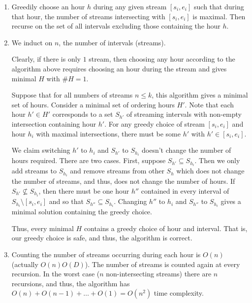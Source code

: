\documentclass[12 pt, letterpaper]{hmcpset}
\begin{document}
\begin{solution}
	\begin{enumerate}
		\item Greedily choose an hour $h$ during any given stream $[s_{i}, e_{i}]$ such that during that hour, the number of streams intersecting with $[s_{i}, e_{i}]$ is maximal. Then recurse on the set of all intervals excluding those containing the hour $h$.

		\item We induct on $n$, the number of intervals (streams). 

			Clearly, if there is only $1$ stream, then choosing any hour according to the algorithm above requires choosing an hour during the stream and gives minimal $H$ with $\# H = 1$.

			Suppose that for all numbers of streams $n \le k$, this algorithm gives a minimal set of hours. Consider a minimal set of ordering hours $H'$. Note that each hour $h' \in H'$ corresponds to a set $S_{h'}$ of streaming intervals with non-empty intersection containing hour $h'$. For any greedy choice of stream $[s_{i}, e_{i}]$ and hour $h_{i}$ with maximal intersections, there must be some $h'$ with $h' \in [s_{i}, e_{i}]$. 

			We claim switching $h'$ to $h_{i}$ and $S_{h'}$ to $S_{h_{i}}$ doesn't change the number of hours required. There are two cases. First, suppose $S_{h'} \subseteq S_{h_{i}}$. Then we only add streams to $S_{h_{i}}$ and remove streams from other $S_{h}$ which does not change the number of streams, and thus, does not change the number of hours. If $S_{h'} \not \subseteq S_{h_{i}}$, then there must be one hour $h''$ contained in every interval of $S_{h_{i}} \setminus [s_{i}, e_{i}]$ and so that $S_{h''} \subseteq S_{h_{i}}$. Changing $h''$ to $h_{i}$ and $S_{h''}$ to $S_{h_{i}}$ gives a minimal solution containing the greedy choice.

			Thus, every minimal $H$ contains a greedy choice of hour and interval. That is, our greedy choice is safe, and thus, the algorithm is correct.

		\item Counting the number of streams occurring during each hour is $O(n)$ (actually $O(n) O(D)$). The number of streams is counted again at every recursion. In the worst case ($n$ non-intersecting streams) there are $n$ recursions, and thus, the algorithm has $O(n) + O(n - 1) + \dots + O(1) = O(n^{2})$ time complexity.
\end{enumerate}
\end{solution}
\end{document}
